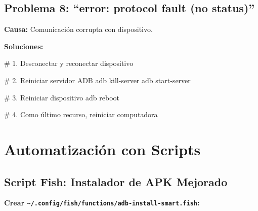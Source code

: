 \documentclass[
  doc,
  floatsintext,
  longtable,
  a4paper,
  nolmodern,
  notxfonts,
  notimes,
  12pt,
  colorlinks=true,linkcolor=blue,citecolor=blue,urlcolor=blue]{apa7}
\newenvironment{Shaded}{\begin{snugshade}}{\end{snugshade}}
\newcommand{\CommentTok}[1]{\textcolor[rgb]{0.37,0.37,0.37}{#1}}
\newcommand{\ExtensionTok}[1]{\textcolor[rgb]{0.00,0.23,0.31}{#1}}
\newcommand{\NormalTok}[1]{\textcolor[rgb]{0.00,0.23,0.31}{#1}}
\begin{document}
\subsection{Problema 8: ``error: protocol fault (no
status)''}\label{problema-8-error-protocol-fault-no-status}

\textbf{Causa:} Comunicación corrupta con dispositivo.

\textbf{Soluciones:}

\begin{Shaded}
\begin{Highlighting}[]
\CommentTok{\# 1. Desconectar y reconectar dispositivo}

\CommentTok{\# 2. Reiniciar servidor ADB}
\ExtensionTok{adb}\NormalTok{ kill{-}server}
\ExtensionTok{adb}\NormalTok{ start{-}server}

\CommentTok{\# 3. Reiniciar dispositivo}
\ExtensionTok{adb}\NormalTok{ reboot}

\CommentTok{\# 4. Como último recurso, reiniciar computadora}
\end{Highlighting}
\end{Shaded}

\section{Automatización con
Scripts}\label{automatizaciuxf3n-con-scripts}

\subsection{Script Fish: Instalador de APK
Mejorado}\label{script-fish-instalador-de-apk-mejorado}

\textbf{Crear
\texttt{\textasciitilde{}/.config/fish/functions/adb-install-smart.fish}:}
\end{document}
